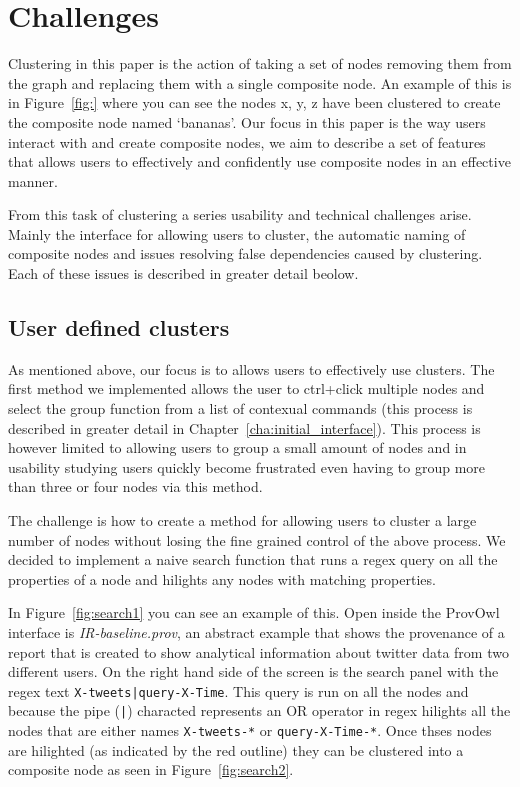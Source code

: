 \chapter{Challenges}


Clustering in this paper is the action of taking a set of nodes removing them from the graph and replacing them with a single composite node. An example of this is in
Figure~\ref{fig:} where you can see the nodes x, y, z have been clustered to create the composite node named `bananas'. Our focus in this paper is the way users interact with and create composite nodes, we aim to describe a set of features that allows users to effectively and confidently use composite nodes in an effective manner.

From this task of clustering a series usability and technical challenges arise. Mainly the interface for allowing users to cluster, the automatic naming of composite nodes and issues resolving false dependencies caused by clustering. Each of these issues is described in greater detail beolow.

\section{User defined clusters}
\label{sec:user_defined_clusters}

As mentioned above, our focus is to allows users to effectively use clusters. The first method we implemented allows the user to ctrl+click multiple nodes and select the group function from a list of contexual commands (this process is described in
greater detail in Chapter~\ref{cha:initial_interface}). This process is however limited to allowing users to group a small amount of nodes and in usability studying users quickly become frustrated even having to group more than three or four nodes via this method.

The challenge is how to create a method for allowing users to cluster a large number of nodes without losing the fine grained control of the above process. We decided to implement a naive search function that runs a regex query on all the properties of a node and hilights any nodes with matching properties.

In Figure~\ref{fig:search1} you can see an example of this. Open inside the ProvOwl interface is \textit{IR-baseline.prov}, an abstract example that shows the provenance of a report that is created to show analytical information about twitter data from two different users. On the right hand side of the screen is the search panel with the regex text \texttt{X-tweets|query-X-Time}. This query is run on all the nodes and because the pipe (\texttt{|}) characted represents an OR operator in regex hilights all the nodes that are either names \texttt{X-tweets-*} or \texttt{query-X-Time-*}. Once thses nodes are hilighted (as indicated by the red outline) they can be clustered into a composite node as seen in Figure~\ref{fig:search2}.

